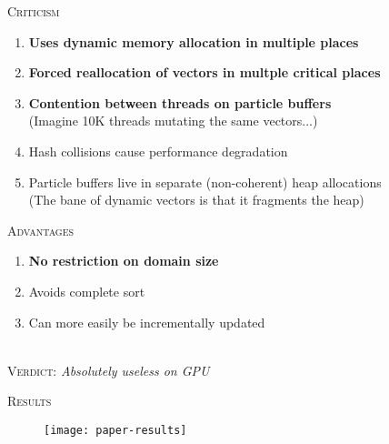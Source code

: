 \documentclass[14pt]{beamer}
\begin{document}
\begin{frame}
\centering
{
\begin{minipage}[c][.7\textheight][t]{.9\textwidth}
\centering
\scriptsize
\textsc{Criticism}\\[.3em]

\raggedright
\begin{enumerate}
\item \textbf{Uses dynamic memory allocation in multiple
places}
\item \textbf{Forced reallocation of vectors in multple
critical places}
\item \textbf{Contention between threads on particle
buffers}\\
    {\color{gray}(Imagine 10K threads mutating the same
    vectors...)}

\item Hash collisions cause performance degradation
\item Particle buffers live in separate (non-coherent) heap
allocations \\
    {\color{gray}(The bane of dynamic vectors is that it
    fragments the heap)}
\end{enumerate}

\pause
\centering
\vspace{1em}
\textsc{Advantages}\\[.3em]

\raggedright
\begin{enumerate}
\item \textbf{No restriction on domain size}
\item Avoids complete sort
\item Can more easily be incrementally updated
\end{enumerate}

\vfill
\centering
{\normalsize
{}}\\[.3em]
\textsc{Verdict:} {\em Absolutely useless on GPU}
\end{minipage}
}
\end{frame}

\begin{frame}
\centering
{
\begin{minipage}[c][.7\textheight][t]{.9\textwidth}
\centering
\scriptsize
\textsc{Results}\\[.3em]
\begin{figure}
\texttt{[image: paper-results]}
\end{figure}

\end{minipage}
}
\end{frame}
\end{document}
